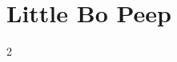 \documentclass[../../../BabySongs]{subfiles}
\begin{document}
\section{Little Bo Peep}

{\tiny%
}
\begin{center}
\end{center}

\begin{guitar}
    \begin{multicols}{2}
        
    \end{multicols}
\end{guitar}
\end{document}
